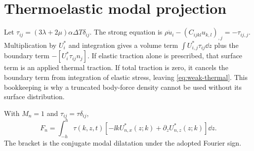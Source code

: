 \chapter{Thermoelastic modal projection}\label{app:projection}
Let $\tau_{ij}=(3\lambda+2\mu)\alpha\Delta T\delta_{ij}$. The strong equation is
$\rho\ddot u_i-(C_{ijkl}u_{k,l})_{,j}=-\tau_{ij,j}$. Multiplication by $U_i^*$
and integration gives a volume term $\int U_{i,j}^*\tau_{ij}\dd z$ plus the
boundary term $-[U_i^*\tau_{ij}n_j]$. If elastic traction alone is prescribed,
that surface term is an applied thermal traction. If total traction is zero, it
cancels the boundary term from integration of elastic stress, leaving
\cref{eq:weak-thermal}. This bookkeeping is why a truncated body-force density
cannot be used without its surface distribution.

With $M_n=1$ and $\tau_{ij}=\tau\delta_{ij}$,
\begin{equation}F_n=\int_{-h}^{h}\tau(k,z,t)
[-\ii kU_{n,x}^*(z;k)+\partial_zU_{n,z}^*(z;k)]\dd z.
\end{equation}
The bracket is the conjugate modal dilatation under the adopted Fourier sign.
